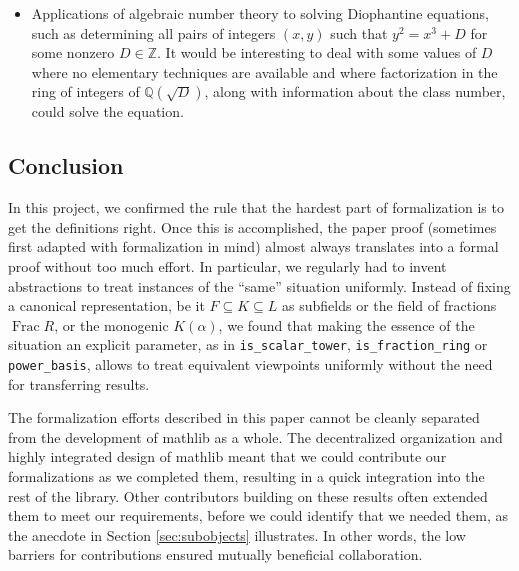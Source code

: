\documentclass[sn-mathphys]{sn-jnl}%
\newcommand{\lean}[1]{\texttt{#1}\xspace}
\newcommand{\mathlib}{\textsf{mathlib}\xspace}
\newcommand{\QQ}{\mathbb{Q}}
\renewcommand{\Z}{\mathbb{Z}}
\DeclareMathOperator{\Frac}{Frac}
\begin{document}
\begin{itemize}
\item Applications of algebraic number theory to solving Diophantine equations, such as determining all pairs of integers $(x,y)$ such that $y^2=x^3+D$ for
some nonzero $D \in \Z$. It would be interesting to deal with some values of $D$ where no elementary techniques are available and where factorization in the ring of integers of $\QQ(\sqrt{D})$, along with information about the class number, could solve the equation.

\end{itemize}

\subsection{Conclusion}

In this project, we confirmed the rule that the hardest part of formalization is to get the definitions right.
Once this is accomplished, the paper proof (sometimes first adapted with formalization in mind) almost always translates into a formal proof without too much effort.
In particular, we regularly had to invent abstractions to treat instances of the ``same'' situation uniformly.
Instead of fixing a canonical representation, be it $F \subseteq K \subseteq L$ as subfields or the field of fractions $\Frac R$, or the monogenic $K(\alpha)$, we found that making the essence of the situation an explicit parameter, as in \lean{is\_scalar\_tower}, \lean{is\_fraction\_ring} or \lean{power\_basis},
allows to treat equivalent viewpoints uniformly without the need for transferring results.

The formalization efforts described in this paper cannot be cleanly separated from the development of \mathlib as a whole.
The decentralized organization and highly integrated design of \mathlib meant that we could contribute our formalizations as we completed them, resulting in a quick integration into the rest of the library.
Other contributors building on these results often extended them to meet our requirements,
before we could identify that we needed them, as the anecdote in Section \ref{sec:subobjects} illustrates.
In other words, the low barriers for contributions ensured mutually beneficial collaboration.
\end{document}
